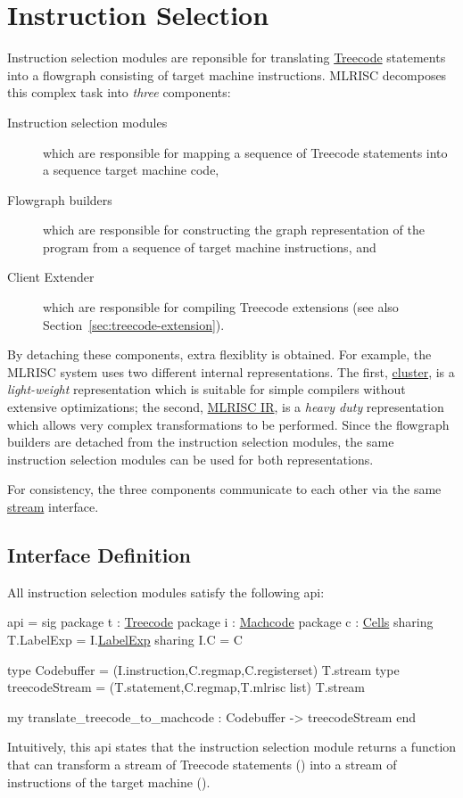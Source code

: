 \section{Instruction Selection} \label{sec:instrsel}
Instruction selection modules are reponsible for translating 
\href{treecode.html}{Treecode} statements into a flowgraph consisting
of target machine instructions.  MLRISC decomposes this complex task 
into \emph{three} components:
\begin{description}
   \item[Instruction selection modules] which are responsible for
mapping a sequence of Treecode statements into a sequence target machine code,
   \item[Flowgraph builders]  which are responsible for constructing
the graph representation of the program from a sequence of target machine
instructions, and
   \item[Client Extender] which are responsible for compiling 
Treecode extensions (see also Section~\ref{sec:treecode-extension}).
\end{description}
By detaching these components, extra flexiblity is obtained.  For example,
the MLRISC system uses two different internal representations.  The
first, \href{cluster.html}{cluster}, is a \emph{light-weight} representation
which is suitable for simple compilers without extensive 
optimizations; the second, \href{mlrisc-ir.html}{MLRISC IR}, is a 
\emph{heavy duty} representation which allows very complex transformations
to be performed.  Since the flowgraph builders are detached from the
instruction selection modules, the same instruction selection modules
can be used for both representations.  

For consistency, the three components communicate to each other 
via the same \href{stream.html}{stream} interface.

\subsection{Interface Definition}
All instruction selection modules satisfy the following api:

\begin{SML}
api  = 
sig
   package t : \href{treecode.html}{Treecode}
   package i : \href{instructions.html}{Machcode}
   package c : \href{cells.html}{Cells}
      sharing T.LabelExp = I.\href{labelexp.html}{LabelExp}
      sharing I.C = C

   type Codebuffer = (I.instruction,C.regmap,C.registerset) T.stream
   type treecodeStream = (T.statement,C.regmap,T.mlrisc list) T.stream

   my translate_treecode_to_machcode : Codebuffer -> treecodeStream
end
\end{SML}
Intuitively, this api states that
the instruction selection module 
returns a function that can transform a stream of Treecode statements 
() into a stream of instructions of the target 
machine ().  

